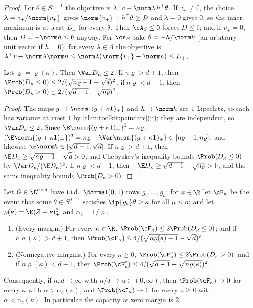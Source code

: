 \begin{refsection}
\begin{proof}
For $\theta\in S^{d-1}$ the objective is $\lambda^\top v+\norm\lambda\,h^\top\theta$. If $v_+\ne0$, the choice $\lambda=v_+/\norm{v_+}$ gives $\norm{v_+}+h^\top\theta\ge D$ and $\lambda=0$ gives $0$, so the inner maximum is at least $D_+$ for every $\theta$. Then $\cA_S\le0$ forces $D\le0$; and if $v_+=0$, then $D=-\norm h\le0$ anyway. For $\cA_B$ take $\theta=-h/\norm h$ (an arbitrary unit vector if $h=0$); for every $\lambda\in\Lambda$ the objective is $\lambda^\top v-\norm\lambda\norm h\le\norm\lambda(\norm{v_+}-\norm h)\le D_+$.
\end{proof}

\begin{lemma}\label{lem:gordon:norms}
Let $\varrho=\varrho(\kappa)$. Then $\Var D_\kappa\le2$. If $n\varrho>d+1$, then $\Prob(D_\kappa\le0)\le2/(\sqrt{n\varrho-1}-\sqrt d)^2$; if $n\varrho<d-1$, then $\Prob(D_\kappa>0)\le2/(\sqrt{d-1}-\sqrt{n\varrho})^2$.
\end{lemma}

\begin{proof}
The maps $g\mapsto\norm{(g+\kappa\mathbf 1)_+}$ and $h\mapsto\norm h$ are $1$-Lipschitz, so each has variance at most $1$ by \cref{thm:toolkit:poincare}(ii); they are independent, so $\Var D_\kappa\le2$. Since $\E\norm{(g+\kappa\mathbf 1)_+}^2=n\varrho$, $(\E\norm{(g+\kappa\mathbf 1)_+})^2=n\varrho-\Var\norm{(g+\kappa\mathbf 1)_+}\in[n\varrho-1,n\varrho]$, and likewise $\E\norm h\in[\sqrt{d-1},\sqrt d]$. If $n\varrho>d+1$, then $\E D_\kappa\ge\sqrt{n\varrho-1}-\sqrt d>0$, and Chebyshev's inequality bounds $\Prob(D_\kappa\le0)$ by $\Var D_\kappa/(\E D_\kappa)^2$. If $n\varrho<d-1$, then $-\E D_\kappa\ge\sqrt{d-1}-\sqrt{n\varrho}>0$, and the same inequality bounds $\Prob(D_\kappa>0)$.
\end{proof}

\begin{theorem}\label{thm:gordon:capacity}
Let $G\in\R^{n\times d}$ have i.i.d.\ $\Normal(0,1)$ rows $g_1,\dots,g_n$; for $\kappa\in\R$ let $\cF_\kappa$ be the event that some $\theta\in S^{d-1}$ satisfies $\ip{g_\mu}\theta\ge\kappa$ for all $\mu\le n$; and let $\varrho(\kappa)=\E(Z+\kappa)_+^2$ and $\alpha_c=1/\varrho$.
\begin{enumerate}
\item (Every margin.) For every $\kappa\in\R$, $\Prob(\cF_\kappa)\le2\Prob(D_\kappa\le0)$; and if $n\varrho(\kappa)>d+1$, then $\Prob(\cF_\kappa)\le4/(\sqrt{n\varrho(\kappa)-1}-\sqrt d)^2$.
\item (Nonnegative margins.) For every $\kappa\ge0$, $\Prob(\cF_\kappa^c)\le2\Prob(D_\kappa>0)$; and if $n\varrho(\kappa)<d-1$, then $\Prob(\cF_\kappa^c)\le4/(\sqrt{d-1}-\sqrt{n\varrho(\kappa)})^2$.
\end{enumerate}
Consequently, if $n,d\to\infty$ with $n/d\to\alpha\in(0,\infty)$, then $\Prob(\cF_\kappa)\to0$ for every $\kappa$ with $\alpha>\alpha_c(\kappa)$, and $\Prob(\cF_\kappa)\to1$ for every $\kappa\ge0$ with $\alpha<\alpha_c(\kappa)$. In particular the capacity at zero margin is $2$.
\end{theorem}


\end{refsection}
